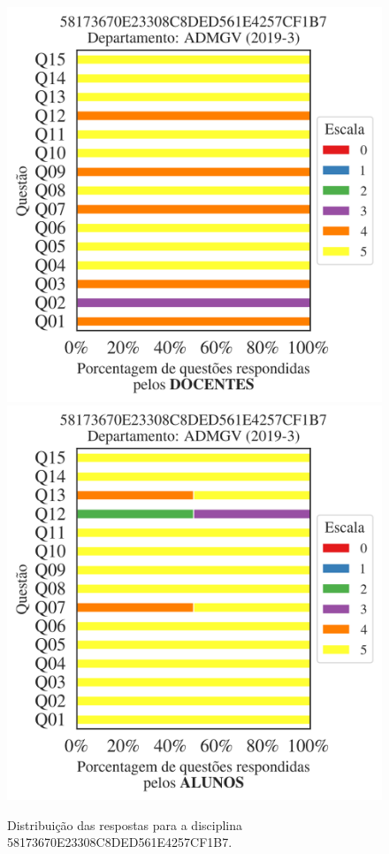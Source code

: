 \documentclass[a4paper,10pt]{article}
\begin{document}
\begin{figure}[h]
\centering
\includegraphics[width=0.485\linewidth]{analise_disciplina_departamento_ADMGV_58173670E23308C8DED561E4257CF1B7_docentes.png}
\includegraphics[width=0.485\linewidth]{analise_disciplina_departamento_ADMGV_58173670E23308C8DED561E4257CF1B7_alunos.png}
\caption{\label{fig:analise_geral_departamento}                Distribuição das respostas para a disciplina 58173670E23308C8DED561E4257CF1B7. }
\end{figure}
\end{document}
